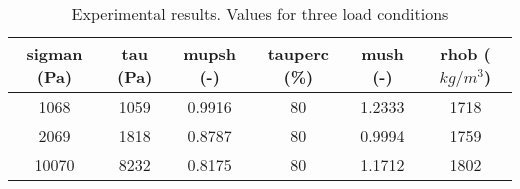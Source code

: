 \begin{table}[h]
\centering
\begin{tabular}{cccccc}
\hline
\acs{sigman} (Pa) & \acs{tau} (Pa) & \acs{mupsh} (-) & \acs{tauperc} (\%) &
\acs{mush} (-) & \acs{rhob} ($kg/m^3$) \\
\hline
    1068  & 1059  & 0.9916 & 80 & 1.2333 & 1718 \\
    2069  & 1818  & 0.8787 & 80 & 0.9994 & 1759 \\
    10070 & 8232  & 0.8175 & 80 & 1.1712 & 1802 \\

\hline
\end{tabular}
\caption[Experimental results]{Experimental results. Values for three
load conditions}
\label{tab:05sinterTableExperimental}
\end{table}